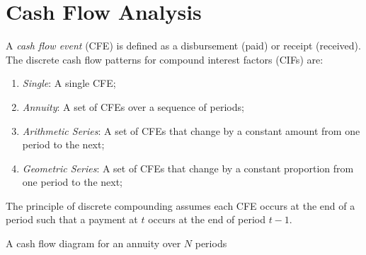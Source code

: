 \documentclass{tufte-book}
\begin{document}
\section{Cash Flow Analysis}
A \emph{cash flow event} (CFE) is defined as a disbursement (paid) or receipt (received). The discrete cash flow patterns for compound interest factors (CIFs) are:
\begin{enumerate}
  \item \emph{Single}: A single CFE;
  \item \emph{Annuity}: A set of CFEs over a sequence of periods;
  \item \emph{Arithmetic Series}: A set of CFEs that change by a constant amount from one period to the next;
  \item \emph{Geometric Series}: A set of CFEs that change by a constant proportion from one period to the next;
\end{enumerate}
The principle of discrete compounding assumes each CFE occurs at the end of a period such that a payment at $t$ occurs at the end of period $t-1$.
%
\begin{marginfigure}
  \begin{center}
     \phantom{mm}
  \end{center}
  \caption{A cash flow diagram for an annuity over $N$ periods}
\end{marginfigure}
%
\end{document}
